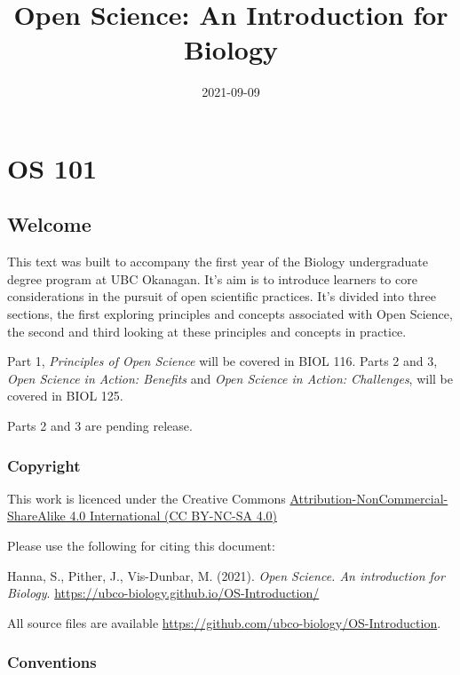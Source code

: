 \documentclass[
]{book}
\title{Open Science: An Introduction for Biology}
\author{}
\date{\vspace{-2.5em}2021-09-09}
\begin{document}
\maketitle

{
\setcounter{tocdepth}{1}
\tableofcontents
}
\hypertarget{part-os-101}{%
\part*{OS 101}\label{part-os-101}}

\hypertarget{welcome}{%
\chapter*{Welcome}\label{welcome}}

This text was built to accompany the first year of the Biology undergraduate degree program at UBC Okanagan. It's aim is to introduce learners to core considerations in the pursuit of open scientific practices. It's divided into three sections, the first exploring principles and concepts associated with Open Science, the second and third looking at these principles and concepts in practice.

Part 1, \emph{Principles of Open Science} will be covered in BIOL 116. Parts 2 and 3, \emph{Open Science in Action: Benefits} and \emph{Open Science in Action: Challenges}, will be covered in BIOL 125.

Parts 2 and 3 are pending release.

\hypertarget{copyright}{%
\section*{Copyright}\label{copyright}}

This work is licenced under the Creative Commons \href{https://creativecommons.org/licenses/by-nc-sa/4.0/}{Attribution-NonCommercial-ShareAlike 4.0 International (CC BY-NC-SA 4.0)}

Please use the following for citing this document:

Hanna, S., Pither, J., Vis-Dunbar, M. (2021). \emph{Open Science. An introduction for Biology}. \url{https://ubco-biology.github.io/OS-Introduction/}

All source files are available \url{https://github.com/ubco-biology/OS-Introduction}.

\hypertarget{conventions}{%
\section*{Conventions}\label{conventions}}
\end{document}
